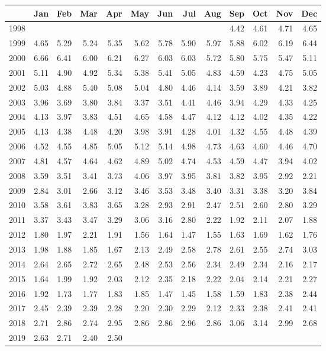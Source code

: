\begin{longtable}{rrrrrrrrrrrrr}
  \hline
 & Jan & Feb & Mar & Apr & May & Jun & Jul & Aug & Sep & Oct & Nov & Dec \\ 
  \hline
1998 &  &  &  &  &  &  &  &  & 4.42 & 4.61 & 4.71 & 4.65 \\ 
  1999 & 4.65 & 5.29 & 5.24 & 5.35 & 5.62 & 5.78 & 5.90 & 5.97 & 5.88 & 6.02 & 6.19 & 6.44 \\ 
  2000 & 6.66 & 6.41 & 6.00 & 6.21 & 6.27 & 6.03 & 6.03 & 5.72 & 5.80 & 5.75 & 5.47 & 5.11 \\ 
  2001 & 5.11 & 4.90 & 4.92 & 5.34 & 5.38 & 5.41 & 5.05 & 4.83 & 4.59 & 4.23 & 4.75 & 5.05 \\ 
  2002 & 5.03 & 4.88 & 5.40 & 5.08 & 5.04 & 4.80 & 4.46 & 4.14 & 3.59 & 3.89 & 4.21 & 3.82 \\ 
  2003 & 3.96 & 3.69 & 3.80 & 3.84 & 3.37 & 3.51 & 4.41 & 4.46 & 3.94 & 4.29 & 4.33 & 4.25 \\ 
  2004 & 4.13 & 3.97 & 3.83 & 4.51 & 4.65 & 4.58 & 4.47 & 4.12 & 4.12 & 4.02 & 4.35 & 4.22 \\ 
  2005 & 4.13 & 4.38 & 4.48 & 4.20 & 3.98 & 3.91 & 4.28 & 4.01 & 4.32 & 4.55 & 4.48 & 4.39 \\ 
  2006 & 4.52 & 4.55 & 4.85 & 5.05 & 5.12 & 5.14 & 4.98 & 4.73 & 4.63 & 4.60 & 4.46 & 4.70 \\ 
  2007 & 4.81 & 4.57 & 4.64 & 4.62 & 4.89 & 5.02 & 4.74 & 4.53 & 4.59 & 4.47 & 3.94 & 4.02 \\ 
  2008 & 3.59 & 3.51 & 3.41 & 3.73 & 4.06 & 3.97 & 3.95 & 3.81 & 3.82 & 3.95 & 2.92 & 2.21 \\ 
  2009 & 2.84 & 3.01 & 2.66 & 3.12 & 3.46 & 3.53 & 3.48 & 3.40 & 3.31 & 3.38 & 3.20 & 3.84 \\ 
  2010 & 3.58 & 3.61 & 3.83 & 3.65 & 3.28 & 2.93 & 2.91 & 2.47 & 2.51 & 2.60 & 2.80 & 3.29 \\ 
  2011 & 3.37 & 3.43 & 3.47 & 3.29 & 3.06 & 3.16 & 2.80 & 2.22 & 1.92 & 2.11 & 2.07 & 1.88 \\ 
  2012 & 1.80 & 1.97 & 2.21 & 1.91 & 1.56 & 1.64 & 1.47 & 1.55 & 1.63 & 1.69 & 1.62 & 1.76 \\ 
  2013 & 1.98 & 1.88 & 1.85 & 1.67 & 2.13 & 2.49 & 2.58 & 2.78 & 2.61 & 2.55 & 2.74 & 3.03 \\ 
  2014 & 2.64 & 2.65 & 2.72 & 2.65 & 2.48 & 2.53 & 2.56 & 2.34 & 2.49 & 2.34 & 2.16 & 2.17 \\ 
  2015 & 1.64 & 1.99 & 1.92 & 2.03 & 2.12 & 2.35 & 2.18 & 2.22 & 2.04 & 2.14 & 2.21 & 2.27 \\ 
  2016 & 1.92 & 1.73 & 1.77 & 1.83 & 1.85 & 1.47 & 1.45 & 1.58 & 1.59 & 1.83 & 2.38 & 2.44 \\ 
  2017 & 2.45 & 2.39 & 2.39 & 2.28 & 2.20 & 2.30 & 2.29 & 2.12 & 2.33 & 2.38 & 2.41 & 2.41 \\ 
  2018 & 2.71 & 2.86 & 2.74 & 2.95 & 2.86 & 2.86 & 2.96 & 2.86 & 3.06 & 3.14 & 2.99 & 2.68 \\ 
  2019 & 2.63 & 2.71 & 2.40 & 2.50 &  &  &  &  &  &  &  &  \\ 
   \hline
\hline
\end{longtable}
